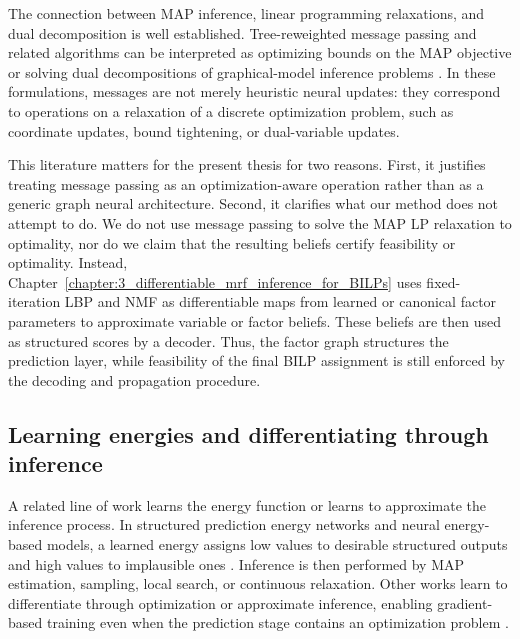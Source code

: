 The connection between MAP inference, linear programming relaxations, and dual decomposition is well established. Tree-reweighted message passing and related algorithms can be interpreted as optimizing bounds on the MAP objective or solving dual decompositions of graphical-model inference problems \cite{kolmogorov_convergent_2006,werner_linear_2007,komodakis_mrf_2007,komodakis_beyond_2009}. In these formulations, messages are not merely heuristic neural updates: they correspond to operations on a relaxation of a discrete optimization problem, such as coordinate updates, bound tightening, or dual-variable updates.

This literature matters for the present thesis for two reasons. First, it justifies treating message passing as an optimization-aware operation rather than as a generic graph neural architecture. Second, it clarifies what our method does not attempt to do. We do not use message passing to solve the MAP LP relaxation to optimality, nor do we claim that the resulting beliefs certify feasibility or optimality. Instead, Chapter~\ref{chapter:3_differentiable_mrf_inference_for_BILPs} uses fixed-iteration LBP and NMF as differentiable maps from learned or canonical factor parameters to approximate variable or factor beliefs. These beliefs are then used as structured scores by a decoder. Thus, the factor graph structures the prediction layer, while feasibility of the final BILP assignment is still enforced by the decoding and propagation procedure.

\subsection{Learning energies and differentiating through inference}
\label{subsec:rw_learning_energies}

A related line of work learns the energy function or learns to approximate the inference process. In structured prediction energy networks and neural energy-based models, a learned energy assigns low values to desirable structured outputs and high values to implausible ones \cite{lecun_tutorial_2006,taskar_learning_2005,belanger_structured_2016}. Inference is then performed by MAP estimation, sampling, local search, or continuous relaxation. Other works learn to differentiate through optimization or approximate inference, enabling gradient-based training even when the prediction stage contains an optimization problem \cite{domke_learning_2013,amos_optnet_2017,donti_task-based_2017,wilder_end_2019,vlastelica_differentiation_2019,berthet_learning_2020,blondel_efficient_2021}.


